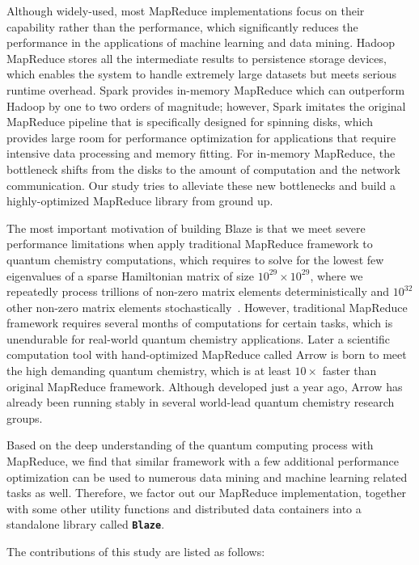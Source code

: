 Although widely-used, most MapReduce implementations focus on their capability rather than the performance, which significantly reduces the performance in the applications of machine learning and data mining. 
Hadoop MapReduce stores all the intermediate results to persistence storage devices, which enables the system to handle extremely large datasets but meets serious runtime overhead. 
Spark provides in-memory MapReduce which can outperform Hadoop by one to two orders of magnitude; however, Spark imitates the original MapReduce pipeline that is specifically designed for spinning disks, which provides large room for performance optimization for applications that require intensive data processing and memory fitting.
For in-memory MapReduce, the bottleneck shifts from the disks to the amount of computation and the network communication. 
Our study tries to alleviate these new bottlenecks and build a highly-optimized MapReduce library from ground up.

The most important motivation of building Blaze is that we meet severe performance limitations when apply traditional MapReduce framework to quantum chemistry computations, which requires to solve for the lowest few eigenvalues of a sparse Hamiltonian matrix of size $10^{29} \times 10^{29}$, where we repeatedly process trillions of non-zero matrix elements deterministically and $10^{32}$ other non-zero matrix elements stochastically~\cite{li2018fast}. 
However, traditional MapReduce framework requires several months of computations for certain tasks, which is unendurable for real-world quantum chemistry applications.
Later a scientific computation tool with hand-optimized MapReduce called Arrow is born to meet the high demanding quantum chemistry, which is at least $10 \times$ faster than original MapReduce framework.
Although developed just a year ago, Arrow has already been running stably in several world-lead quantum chemistry research groups.

Based on the deep understanding of the quantum computing process with MapReduce, we find that similar framework with a few additional performance optimization can be used to numerous data mining and machine learning related tasks as well. 
Therefore, we factor out our MapReduce implementation, together with some other utility functions and distributed data containers into a standalone library called \texttt{\textbf{Blaze}}.

The contributions of this study are listed as follows:

